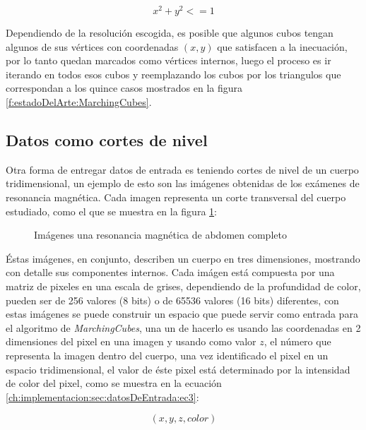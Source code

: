 \begin{equation}
\label{ch:implementacion:sec:datosDeEntrada:ec2}
	x^{2} + y^{2} <= 1
\end{equation}

Dependiendo de la resolución escogida, es posible que algunos cubos tengan algunos de sus vértices con coordenadas $(x,y)$ que satisfacen a la inecuación, por lo tanto quedan marcados como vértices internos, luego el proceso es ir iterando en todos esos cubos y reemplazando los cubos por los triangulos que correspondan a los quince casos mostrados en la figura \ref{f:estadoDelArte:MarchingCubes}.

\subsection{Datos como cortes de nivel}
\label{ch:implementacion:sec:datosDeEntrada:subsec:datoscomocurvasdenivel}

Otra forma de entregar datos de entrada es teniendo cortes de nivel de un cuerpo tridimensional, un ejemplo de esto son las imágenes obtenidas de los exámenes de resonancia magnética. Cada imagen representa un corte transversal del cuerpo estudiado, como el que se muestra en la figura \ref{f:ch:implementacion:sec:datosdeentrada:img:ejemplodernm}:

\begin{figure}[hbt]
	\makebox[\textwidth]{\framebox[0.5\textwidth]{\rule{0pt}{0.5\textwidth}}}
	\caption{Imágenes una resonancia magnética de abdomen completo}
	\label{f:ch:implementacion:sec:datosdeentrada:img:ejemplodernm}
\end{figure}

Éstas imágenes, en conjunto, describen un cuerpo en tres dimensiones, mostrando con detalle sus componentes internos. Cada imágen está compuesta por una matriz de pixeles en una escala de grises, dependiendo de la profundidad de color, pueden ser de 256 valores (8 bits) o de 65536 valores (16 bits) diferentes, con estas imágenes se puede construir un espacio que puede servir como entrada para el algoritmo de \emph{MarchingCubes}, una un de hacerlo es usando las coordenadas en 2 dimensiones del pixel en una imagen y usando como valor $z$, el número que representa la imagen dentro del cuerpo, una vez identificado el pixel en un espacio tridimensional, el valor de éste pixel está determinado por la intensidad de color del pixel, como se muestra en la ecuación \ref{ch:implementacion:sec:datosDeEntrada:ec3}:

\begin{equation}
\label{ch:implementacion:sec:datosDeEntrada:ec3}
	(x,y,z,color)
\end{equation}

